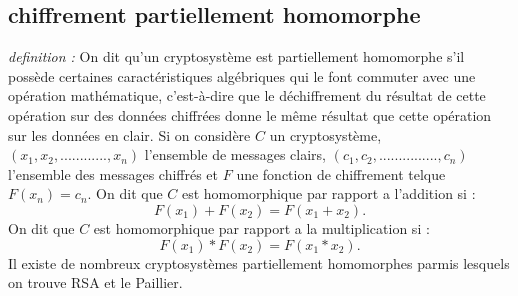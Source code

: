 \documentclass[a4paper,12pt]{report}
\begin{document}
\subsection{chiffrement partiellement homomorphe}
\textit{definition : } On dit qu'un cryptosystème est partiellement homomorphe  s'il possède certaines caractéristiques algébriques qui le font commuter avec une opération mathématique, c'est-à-dire que le déchiffrement du résultat de cette opération sur des données chiffrées donne le même résultat que cette opération sur les données en clair. \newline
Si on considère $C$ un cryptosystème, $(x_1, x_2, ............, x_n)$ l'ensemble de messages clairs, $(c_1, c_2, ..............., c_n)$ l'ensemble des messages chiffrés et $ F$ une fonction de chiffrement telque $F(x_n) = c_n$. \newline
On dit que $C$ est homomorphique par rapport a l'addition si : \newline
 $$F(x_1) + F(x_2) = F(x_1 + x_2).$$
 On dit que $C$ est homomorphique par rapport a la multiplication si : \newline
 $$F(x_1) * F(x_2) = F(x_1 * x_2).$$
Il existe de nombreux cryptosystèmes partiellement homomorphes parmis lesquels on trouve RSA et le Paillier.%
\end{document}
